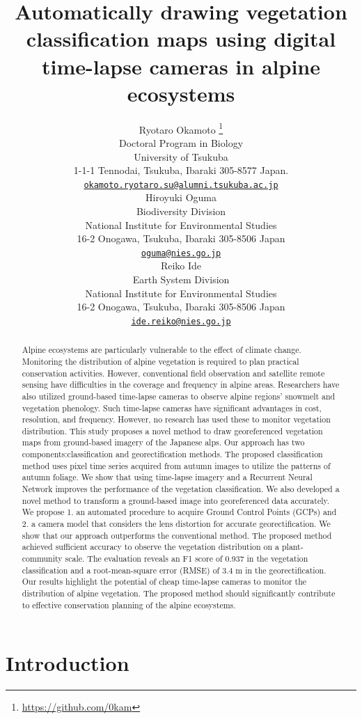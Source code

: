 \documentclass{article}
\title{Automatically drawing vegetation classification maps using digital time-lapse cameras in alpine ecosystems}
\author{
    Ryotaro Okamoto
    \thanks{\url{https://github.com/0kam}}
   \\
    Doctoral Program in Biology \\
    University of Tsukuba \\
  1-1-1 Tennodai, Tsukuba, Ibaraki 305-8577 Japan. \\
  \texttt{\href{mailto:okamoto.ryotaro.su@alumni.tsukuba.ac.jp}{\nolinkurl{okamoto.ryotaro.su@alumni.tsukuba.ac.jp}}} \\
   \And
    Hiroyuki Oguma
   \\
    Biodiversity Division \\
    National Institute for Environmental Studies \\
  16-2 Onogawa, Tsukuba, Ibaraki 305-8506 Japan \\
  \texttt{\href{mailto:oguma@nies.go.jp}{\nolinkurl{oguma@nies.go.jp}}} \\
   \And
    Reiko Ide
   \\
    Earth System Division \\
    National Institute for Environmental Studies \\
  16-2 Onogawa, Tsukuba, Ibaraki 305-8506 Japan \\
  \texttt{\href{mailto:ide.reiko@nies.go.jp}{\nolinkurl{ide.reiko@nies.go.jp}}} \\
  }
\begin{document}
\maketitle


\begin{abstract}
Alpine ecosystems are particularly vulnerable to the effect of climate change. Monitoring the distribution of alpine vegetation is required to plan practical conservation activities. However, conventional field observation and satellite remote sensing have difficulties in the coverage and frequency in alpine areas. Researchers have also utilized ground-based time-lapse cameras to observe alpine regions' snowmelt and vegetation phenology. Such time-lapse cameras have significant advantages in cost, resolution, and frequency. However, no research has used these to monitor vegetation distribution. This study proposes a novel method to draw georeferenced vegetation maps from ground-based imagery of the Japanese alps. Our approach has two components:classification and georectification methods. The proposed classification method uses pixel time series acquired from autumn images to utilize the patterns of autumn foliage. We show that using time-lapse imagery and a Recurrent Neural Network improves the performance of the vegetation classification. We also developed a novel method to transform a ground-based image into georeferenced data accurately. We propose 1. an automated procedure to acquire Ground Control Points (GCPs) and 2. a camera model that considers the lens distortion for accurate georectification. We show that our approach outperforms the conventional method. The proposed method achieved sufficient accuracy to observe the vegetation distribution on a plant-community scale. The evaluation reveals an F1 score of 0.937 in the vegetation classification and a root-mean-square error (RMSE) of 3.4 m in the georectification. Our results highlight the potential of cheap time-lapse cameras to monitor the distribution of alpine vegetation. The proposed method should significantly contribute to effective conservation planning of the alpine ecosystems.
\end{abstract}


\hypertarget{introduction}{%
\section{Introduction}\label{introduction}}
\end{document}

